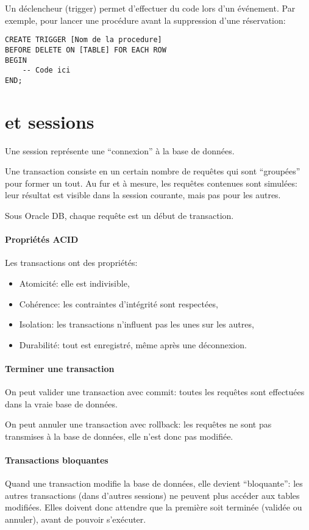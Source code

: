\documentclass[10pt,a4paper,french]{article}
\begin{document}
Un déclencheur (trigger) permet d'effectuer du code lors d'un événement. Par exemple, pour lancer une procédure avant la suppression d'une réservation:
\begin{verbatim}
CREATE TRIGGER [Nom de la procedure]
BEFORE DELETE ON [TABLE] FOR EACH ROW
BEGIN
    -- Code ici
END;
\end{verbatim}

\section{ et sessions}\label{transaction}

Une session représente une ``connexion'' à la base de données.

Une transaction consiste en un certain nombre de requêtes qui sont ``groupées'' pour former un tout. Au fur et à mesure, les requêtes contenues sont simulées: leur résultat est visible dans la session courante, mais pas pour les autres.

Sous Oracle DB, chaque requête est un début de transaction.

\paragraph{Propriétés ACID}
Les transactions ont des propriétés:
\begin{itemize}
\item Atomicité: elle est indivisible,
\item Cohérence: les contraintes d'intégrité sont respectées,
\item Isolation: les transactions n'influent pas les unes sur les autres,
\item Durabilité: tout est enregistré, même après une déconnexion.
\end{itemize}

\paragraph{Terminer une transaction}
On peut valider une transaction avec \gls{commit}: toutes les requêtes sont effectuées dans la vraie base de données.

On peut annuler une transaction avec \gls{rollback}: les requêtes ne sont pas transmises à la base de données, elle n'est donc pas modifiée.

\paragraph{Transactions bloquantes}
Quand une transaction modifie la base de données, elle devient ``bloquante'': les autres transactions (dans d'autres sessions) ne peuvent plus accéder aux tables modifiées. Elles doivent donc attendre que la première soit terminée (validée ou annuler), avant de pouvoir s'exécuter.
\end{document}
